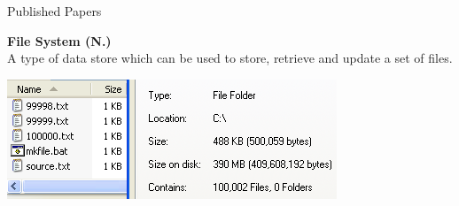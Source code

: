 \begin{frame}[t]{Published Papers}

  \hspace*{.6in}
  \begin{minipage}{3.5in}
  \begin{center}
	\vspace*{.3in}
	\textbf{File System (N.)}\\
	A type of data store which can be used to store, retrieve and update a set of files.\\
	\vspace*{.3in}

  \includegraphics[scale=.70]{filesystem.png}
  
  \end{center}
  \end{minipage}

\end{frame}